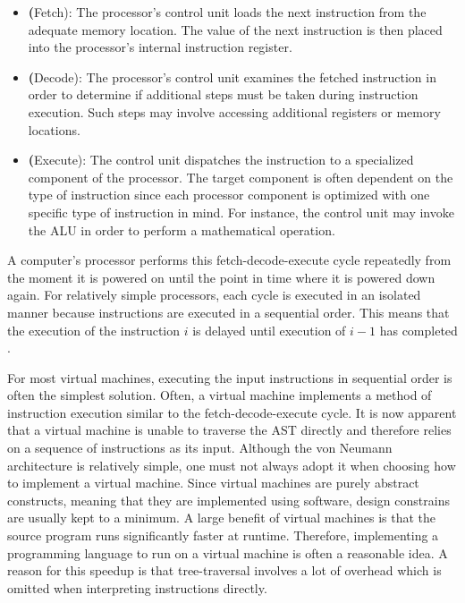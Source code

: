 \begin{itemize}
    \item \textbf(Fetch): The processor's control unit loads the next instruction from the adequate memory location.
          The value of the next instruction is then placed into the processor's internal instruction register.
    \item \textbf(Decode):
          The processor's control unit examines the fetched instruction in order to determine if additional steps must be taken during instruction execution.
          Such steps may involve accessing additional registers or memory locations.
    \item \textbf(Execute):
          The control unit dispatches the instruction to a specialized component of the processor.
          The target component is often dependent on the type of instruction since each processor component is optimized with one specific type of instruction in mind.
          For instance, the control unit may invoke the ALU in order to perform a mathematical operation.
\end{itemize}

A computer's processor performs this fetch-decode-execute cycle repeatedly from the moment it is powered on until the point in time where it is powered down again.
For relatively simple processors, each cycle is executed in an isolated manner because instructions are executed in a sequential order.
This means that the execution of the instruction $i$ is delayed until execution of $i - 1$ has completed \cite[pp.~208-209]{Ledin2020-yp}.

For most virtual machines, executing the input instructions in sequential order is often the simplest solution.
Often, a virtual machine implements a method of instruction execution similar to the fetch-decode-execute cycle.
It is now apparent that a virtual machine is unable to traverse the AST directly and therefore relies on a sequence of instructions as its input.
Although the von Neumann architecture is relatively simple, one must not always adopt it when choosing how to implement a virtual machine.
Since virtual machines are purely abstract constructs, meaning that they are implemented using software, design constrains are usually kept to a minimum.
A large benefit of virtual machines is that the source program runs significantly faster at runtime.
Therefore, implementing a programming language to run on a virtual machine is often a reasonable idea.
A reason for this speedup is that tree-traversal involves a lot of overhead which is omitted when interpreting instructions directly.

